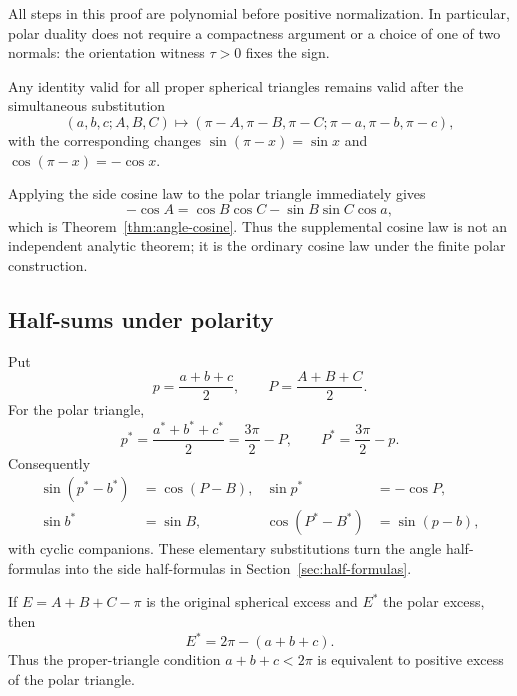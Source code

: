 All steps in this proof are polynomial before positive normalization.  In
particular, polar duality does not require a compactness argument or a choice
of one of two normals: the orientation witness \(\tau>0\) fixes the sign.

\begin{corollary}
\label{cor:duality-principle}
Any identity valid for all proper spherical triangles remains valid after the
simultaneous substitution
\begin{equation}
 (a,b,c;A,B,C)
 \longmapsto
 (\pi-A,\pi-B,\pi-C;\pi-a,\pi-b,\pi-c),                   \tag{5.5}
\end{equation}
with the corresponding changes
\(\sin(\pi-x)=\sin x\) and \(\cos(\pi-x)=-\cos x\).
\end{corollary}

Applying the side cosine law to the polar triangle immediately gives
\[
 -\cos A=\cos B\cos C-\sin B\sin C\cos a,
\]
which is Theorem~\ref{thm:angle-cosine}.  Thus the supplemental cosine law is
not an independent analytic theorem; it is the ordinary cosine law under the
finite polar construction.

\subsection{Half-sums under polarity}

Put
\begin{equation}
 p=\frac{a+b+c}{2},\qquad P=\frac{A+B+C}{2}.                \tag{5.6}
\end{equation}
For the polar triangle,
\begin{equation}
 p^*=\frac{a^*+b^*+c^*}{2}=\frac{3\pi}{2}-P,
 \qquad
 P^*=\frac{3\pi}{2}-p.                                    \tag{5.7}
\end{equation}
Consequently
\begin{align}
 \sin(p^*-b^*)&=\cos(P-B),&
 \sin p^*&=-\cos P,                                       \tag{5.8}\\
 \sin b^*&=\sin B,&
 \cos(P^*-B^*)&=\sin(p-b),                                \tag{5.9}
\end{align}
with cyclic companions.  These elementary substitutions turn the angle
half-formulas into the side half-formulas in Section~\ref{sec:half-formulas}.

\begin{corollary}
If \(E=A+B+C-\pi\) is the original spherical excess and \(E^*\) the polar
excess, then
\begin{equation}
 E^*=2\pi-(a+b+c).                                         \tag{5.10}
\end{equation}
Thus the proper-triangle condition \(a+b+c<2\pi\) is equivalent to positive
excess of the polar triangle.
\end{corollary}

